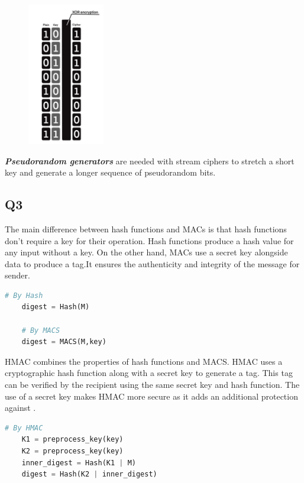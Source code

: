 \documentclass{article}
\begin{document}
    \begin{figure}[htbp]
        \centering %
        \includegraphics[width=0.3\textwidth]{graphs/Stream_cipher.jpg} 
    \end{figure}

	\textbf{\textit{Pseudorandom generators}} are needed with stream ciphers to stretch a short key and generate a longer sequence of pseudorandom bits\cite{3-1.Symmetric-Crypto}. 


\subsection{Q3}
	The main difference between hash functions and MACs is that hash functions don't require a key for their operation. Hash functions produce a hash value for any input without a key. On the other hand, MACs use a secret key alongside data to produce a tag.It ensures the authenticity and integrity of the message for sender\cite{3-1.Symmetric-Crypto}.

	\begin{lstlisting}[language=Python]
	# By Hash
	digest = Hash(M)

	# By MACS
	digest = MACS(M,key)
	\end{lstlisting}

	HMAC combines the properties of hash functions and MACS. HMAC uses a cryptographic hash function along with a secret key to generate a tag. This tag can be verified by the recipient using the same secret key and hash function. The use of a secret key makes HMAC more secure as it adds an additional protection against .

	\begin{lstlisting}[language=Python]
	# By HMAC 
	K1 = preprocess_key(key)
	K2 = preprocess_key(key)
	inner_digest = Hash(K1 | M)
	digest = Hash(K2 | inner_digest)
	\end{lstlisting}
\end{document}
